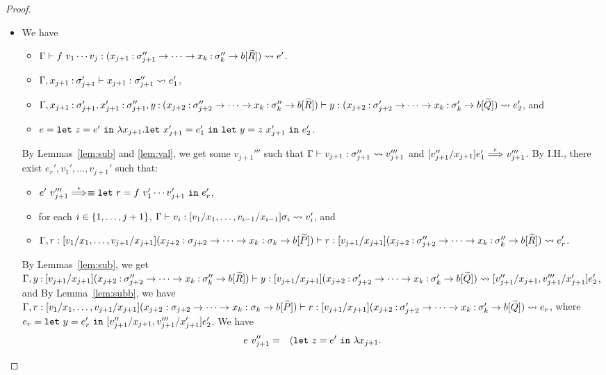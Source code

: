 \begin{proof}
\begin{itemize}
\item[] 
We have
\begin{itemize}
\item \(\Gamma \vdash f\ v_1\cdots v_j : (x_{j+1}\mathbin{:}\sigma_{j+1}'' \to \cdots \to x_k\mathbin{:}\sigma_k'' \to b[\widetilde{R}]) \leadsto e'\).
\item \(\Gamma,x_{j+1}\mathbin{:}\sigma_{j+1}' \vdash x_{j+1} : \sigma_{j+1}'' \leadsto e_1'\),
\item \(\Gamma,x_{j+1}\mathbin{:}\sigma_{j+1}',x_{j+1}'\mathbin{:}\sigma_{j+1}'',y\mathbin{:} (x_{j+2}\mathbin{:}\sigma_{j+2}'' \to \cdots \to x_k\mathbin{:}\sigma_k'' \to b[\widetilde{R}]) \vdash y : (x_{j+2}\mathbin{:}\sigma_{j+2}' \to \cdots \to x_k\mathbin{:}\sigma_k' \to b[\widetilde{Q}]) \leadsto e_2'\), and
\item \(e=\LETEQIN{z}{e'}\lambda x_{j+1}.\LETEQIN{x_{j+1}'}{e_1'}\LETEQIN{y}{z\ x_{j+1}'}e_2'\).
\end{itemize}
By Lemmas~\ref{lem:sub} and \ref{lem:val}, we get some \(v_{j+1}'''\) such that
\(\Gamma \vdash v_{j+1} : \sigma_{j+1}'' \leadsto v_{j+1}'''\) and
\([v_{j+1}''/x_{j+1}]e_1' \stackrel{\epsilon}{\Longrightarrow}_{} v_{j+1}'''\).
%
By I.H., there exist \(e_r',v_1',\dots,v_{j+1}'\) such that:
\begin{itemize}
\item \(e'\ v_{j+1}''' \stackrel{\epsilon}{\Longrightarrow}_{}\equiv \mathtt{let~}r=f\ v_1'\cdots v_{j+1}'\mathtt{~in~}{e_r'}\),
\item for each \(i \in \{1,\dots,j+1\}\), \(\Gamma \vdash v_i : [v_1/x_1,\dots,v_{i-1}/x_{i-1}]\sigma_i \leadsto v_i'\), and
\item
\(\Gamma,r:[v_1/x_1,\dots,v_{j+1}/x_{j+1}](x_{j+2}:\sigma_{j+2} \to \cdots \to x_k:\sigma_k \to b[\widetilde{P}]) \vdash r : [v_{j+1}/x_{j+1}](x_{j+2}\mathbin{:}\sigma_{j+2}'' \to \cdots \to x_k\mathbin{:}\sigma_k'' \to b[\widetilde{R}]) \leadsto e_r'\).
\end{itemize}
By Lemmas~\ref{lem:sub}, we get
\(\Gamma,y\mathbin{:} [v_{j+1}/x_{j+1}](x_{j+2}\mathbin{:}\sigma_{j+2}'' \to \cdots \to x_k\mathbin{:}\sigma_k'' \to b[\widetilde{R}]) \vdash y : [v_{j+1}/x_{j+1}](x_{j+2}\mathbin{:}\sigma_{j+2}' \to \cdots \to x_k\mathbin{:}\sigma_k' \to b[\widetilde{Q}]) \leadsto [v_{j+1}''/x_{j+1},v_{j+1}'''/x_{j+1}']e_2'\), and
%
By Lemma~\ref{lem:subb}, we have
\(\Gamma,r:[v_1/x_1,\dots,v_{j+1}/x_{j+1}](x_{j+2}:\sigma_{j+2} \to \cdots \to x_k:\sigma_k \to b[\widetilde{P}]) \vdash r : [v_{j+1}/x_{j+1}](x_{j+2}\mathbin{:}\sigma_{j+2}' \to \cdots \to x_k\mathbin{:}\sigma_k' \to b[\widetilde{Q}]) \leadsto e_r\), where
\(e_r=\mathtt{let~}y=e_r'\mathtt{~in~}[v_{j+1}''/x_{j+1},v_{j+1}'''/x_{j+1}']e_2'\).
%
We have
\begin{eqnarray*}
e\ v_{j+1}''
&=&(\LETEQIN{z}{e'}\lambda x_{j+1}.\\

\end{eqnarray*}
\end{itemize}
\end{proof}
